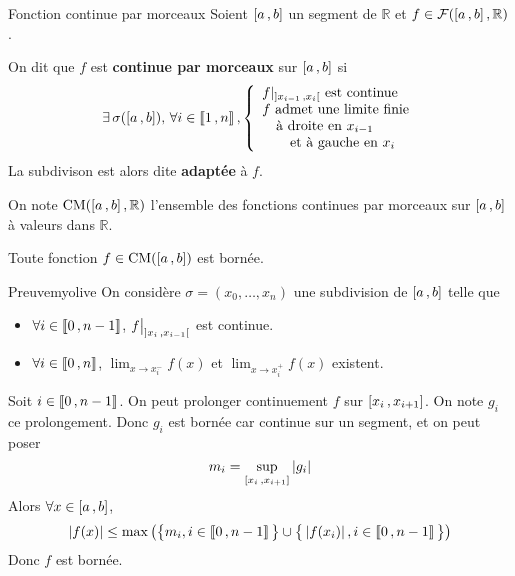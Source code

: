     \begin{defi}{Fonction continue par morceaux}{}
        Soient $\left[ a \, , b \right]$ un segment de $\mathbb{R}$ et $f \in \mathcal{F}(\left[ a \, , b \right],\mathbb{R})$.

        On dit que $f$ est \textbf{continue par morceaux} sur $\left[ a \, , b \right]$ si 
        \[ \exists \,\sigma(\left[ a \, , b \right]), \, \forall i \in \left\llbracket 1 \, , n \right\rrbracket, \left\{ \begin{array}{l} 
            f \vert_{\left] x_{i-1} \, , x_i \right[} \text{ est continue} \\
            f \text{ admet une limite finie}  \\
            \quad \text{à droite en } x_{i-1} \\
            \qquad \text{et à gauche en } x_i
        \end{array} \right. \]
        La subdivison est alors dite \textbf{adaptée} à $f$.

        On note $\operatorname{CM}(\left[ a \, , b \right],\mathbb{R})$ l’ensemble des fonctions continues par morceaux sur $\left[ a \, , b \right]$ à valeurs dans $\mathbb{R}$.
    \end{defi}

    \begin{prop}{}{}
        Toute fonction $f \in \operatorname{CM}(\left[ a \, , b \right])$ est bornée.
    \end{prop}

    \begin{demo}{Preuve}{myolive}
        On considère $\sigma = (x_0, \ldots, x_n)$ une subdivision de $\left[ a \, , b \right]$ telle que 
        \begin{itemize}
            \item $\forall i \in \left\llbracket 0 \, , n-1 \right\rrbracket$, $\restr{f}{\intervalleOO{x_i}{x_{i-1}}}$ est continue.
            \item $ \forall i \in \left\llbracket 0 \, , n \right\rrbracket$, $\lim_{x \to x_i^-} f(x)$ et $\lim_{x \to x_i^+} f(x)$ existent.
        \end{itemize}
        Soit $i \in \left\llbracket 0 \, , n-1 \right\rrbracket$. On peut prolonger continuement $f$ sur $\left[ x_i \, , x_{i+1} \right]$. On note $g_i$ ce prolongement. Donc $g_i$ est bornée car continue sur un segment, et on peut poser 
        \[ m_i = \sup_{\left[ x_i \, , x_{i+1} \right]} \left\lvert g_i\right\rvert \]   
        Alors $\forall x \in \left[ a \, , b \right]$, 
        \[ \left\lvert f(x)\right\rvert \leq \max \left(\big\{ m_i , i \in \left\llbracket 0 \, , n-1 \right\rrbracket \big\} \cup \big\{ \left\lvert f(x_i)\right\rvert , i \in \left\llbracket 0 \, , n-1 \right\rrbracket \big\} \right) \]
        Donc $f$ est bornée.
    \end{demo}

